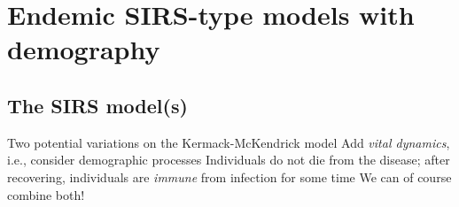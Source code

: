 \documentclass[aspectratio=169]{beamer}\usepackage[]{graphicx}\usepackage[]{xcolor}
\begin{document}
\section{Endemic SIRS-type models with demography}

\subsection{The SIRS model(s)}
\begin{frame}{Two potential variations on the Kermack-McKendrick model}
\bbullet Add \emph{vital dynamics}, i.e., consider demographic processes
\vfill
\bbullet Individuals do not die from the disease; after recovering, individuals are \emph{immune} from infection for some time
\vfill
\bbullet We can of course combine both!
\end{frame}
\end{document}
